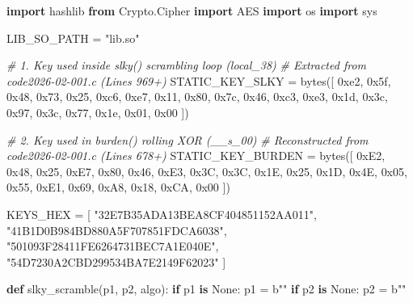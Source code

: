 \documentclass[
]{article}
\newenvironment{Shaded}{}{}
\newcommand{\BaseNTok}[1]{\textcolor[rgb]{0.25,0.63,0.44}{#1}}
\newcommand{\BuiltInTok}[1]{\textcolor[rgb]{0.00,0.50,0.00}{#1}}
\newcommand{\CommentTok}[1]{\textcolor[rgb]{0.38,0.63,0.69}{\textit{#1}}}
\newcommand{\ControlFlowTok}[1]{\textcolor[rgb]{0.00,0.44,0.13}{\textbf{#1}}}
\newcommand{\ImportTok}[1]{\textcolor[rgb]{0.00,0.50,0.00}{\textbf{#1}}}
\newcommand{\KeywordTok}[1]{\textcolor[rgb]{0.00,0.44,0.13}{\textbf{#1}}}
\newcommand{\NormalTok}[1]{#1}
\newcommand{\OperatorTok}[1]{\textcolor[rgb]{0.40,0.40,0.40}{#1}}
\newcommand{\StringTok}[1]{\textcolor[rgb]{0.25,0.44,0.63}{#1}}
\newcommand{\VariableTok}[1]{\textcolor[rgb]{0.10,0.09,0.49}{#1}}
\begin{document}
\begin{Shaded}
\begin{Highlighting}[]
\ImportTok{import}\NormalTok{ hashlib}
\ImportTok{from}\NormalTok{ Crypto.Cipher }\ImportTok{import}\NormalTok{ AES}
\ImportTok{import}\NormalTok{ os}
\ImportTok{import}\NormalTok{ sys}

\NormalTok{LIB\_SO\_PATH }\OperatorTok{=} \StringTok{"lib.so"}

\CommentTok{\# 1. Key used inside slky() scrambling loop (local\_38)}
\CommentTok{\# Extracted from code2026{-}02{-}001.c (Lines 969+)}
\NormalTok{STATIC\_KEY\_SLKY }\OperatorTok{=} \BuiltInTok{bytes}\NormalTok{([}
    \BaseNTok{0xe2}\NormalTok{, }\BaseNTok{0x5f}\NormalTok{, }\BaseNTok{0x48}\NormalTok{, }\BaseNTok{0x73}\NormalTok{, }\BaseNTok{0x25}\NormalTok{, }\BaseNTok{0xc6}\NormalTok{, }\BaseNTok{0xe7}\NormalTok{, }\BaseNTok{0x11}\NormalTok{, }
    \BaseNTok{0x80}\NormalTok{, }\BaseNTok{0x7c}\NormalTok{, }\BaseNTok{0x46}\NormalTok{, }\BaseNTok{0xc3}\NormalTok{, }\BaseNTok{0xe3}\NormalTok{, }\BaseNTok{0x1d}\NormalTok{, }\BaseNTok{0x3c}\NormalTok{, }\BaseNTok{0x97}\NormalTok{, }
    \BaseNTok{0x3c}\NormalTok{, }\BaseNTok{0x77}\NormalTok{, }\BaseNTok{0x1e}\NormalTok{, }\BaseNTok{0x01}\NormalTok{, }\BaseNTok{0x00}
\NormalTok{])}

\CommentTok{\# 2. Key used in burden() rolling XOR (\_\_s\_00)}
\CommentTok{\# Reconstructed from code2026{-}02{-}001.c (Lines 678+)}
\NormalTok{STATIC\_KEY\_BURDEN }\OperatorTok{=} \BuiltInTok{bytes}\NormalTok{([}
    \BaseNTok{0xE2}\NormalTok{, }\BaseNTok{0x48}\NormalTok{, }\BaseNTok{0x25}\NormalTok{, }\BaseNTok{0xE7}\NormalTok{, }\BaseNTok{0x80}\NormalTok{, }\BaseNTok{0x46}\NormalTok{, }\BaseNTok{0xE3}\NormalTok{, }\BaseNTok{0x3C}\NormalTok{,}
    \BaseNTok{0x3C}\NormalTok{, }\BaseNTok{0x1E}\NormalTok{, }\BaseNTok{0x25}\NormalTok{, }\BaseNTok{0x1D}\NormalTok{, }\BaseNTok{0x4E}\NormalTok{, }\BaseNTok{0x05}\NormalTok{, }\BaseNTok{0x55}\NormalTok{, }\BaseNTok{0xE1}\NormalTok{,}
    \BaseNTok{0x69}\NormalTok{, }\BaseNTok{0xA8}\NormalTok{, }\BaseNTok{0x18}\NormalTok{, }\BaseNTok{0xCA}\NormalTok{, }\BaseNTok{0x00}
\NormalTok{])}

\NormalTok{KEYS\_HEX }\OperatorTok{=}\NormalTok{ [}
    \StringTok{"32E7B35ADA13BEA8CF404851152AA011"}\NormalTok{,}
    \StringTok{"41B1D0B984BD880A5F707851FDCA6038"}\NormalTok{,}
    \StringTok{"501093F28411FE6264731BEC7A1E040E"}\NormalTok{,}
    \StringTok{"54D7230A2CBD299534BA7E2149F62023"}
\NormalTok{]}

\KeywordTok{def}\NormalTok{ slky\_scramble(p1, p2, algo):}
    \ControlFlowTok{if}\NormalTok{ p1 }\KeywordTok{is} \VariableTok{None}\NormalTok{: p1 }\OperatorTok{=} \StringTok{b""}
    \ControlFlowTok{if}\NormalTok{ p2 }\KeywordTok{is} \VariableTok{None}\NormalTok{: p2 }\OperatorTok{=} \StringTok{b""}
    

\end{Highlighting}
\end{Shaded}
\end{document}
